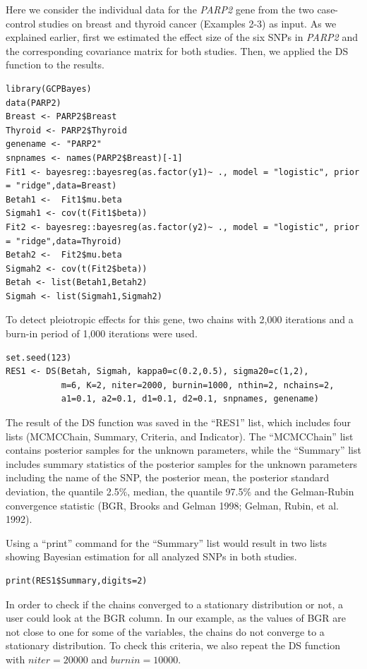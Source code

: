 Here we consider the individual data for the \emph{PARP2} gene from the two case-control studies on breast and thyroid cancer (Examples 2-3) as input. As we explained earlier, first we estimated the effect size of the six SNPs in \emph{PARP2} and the corresponding covariance matrix for both studies. Then, we applied the DS function to the results.

\begin{verbatim}
library(GCPBayes)
data(PARP2)
Breast <- PARP2$Breast
Thyroid <- PARP2$Thyroid
genename <- "PARP2"
snpnames <- names(PARP2$Breast)[-1]
Fit1 <- bayesreg::bayesreg(as.factor(y1)~ ., model = "logistic", prior = "ridge",data=Breast)
Betah1 <-  Fit1$mu.beta
Sigmah1 <- cov(t(Fit1$beta))
Fit2 <- bayesreg::bayesreg(as.factor(y2)~ ., model = "logistic", prior = "ridge",data=Thyroid)
Betah2 <-  Fit2$mu.beta
Sigmah2 <- cov(t(Fit2$beta))
Betah <- list(Betah1,Betah2)
Sigmah <- list(Sigmah1,Sigmah2)
\end{verbatim}

To detect pleiotropic effects for this gene, two chains with 2,000 iterations and a burn-in period of 1,000 iterations were used.

\begin{verbatim}
set.seed(123)
RES1 <- DS(Betah, Sigmah, kappa0=c(0.2,0.5), sigma20=c(1,2),
           m=6, K=2, niter=2000, burnin=1000, nthin=2, nchains=2,
           a1=0.1, a2=0.1, d1=0.1, d2=0.1, snpnames, genename)
\end{verbatim}

The result of the DS function was saved in the ``RES1'' list, which includes four lists (MCMCChain, Summary, Criteria, and Indicator).
The ``MCMCChain'' list contains posterior samples for the unknown parameters, while the ``Summary'' list includes summary statistics of the posterior samples for the unknown parameters including the name of the SNP, the posterior mean, the posterior standard deviation, the quantile 2.5\(\%\), median, the quantile 97.5\(\%\) and the Gelman-Rubin convergence statistic (BGR, Brooks and Gelman 1998; Gelman, Rubin, et al. 1992).

Using a ``print'' command for the ``Summary'' list would result in two lists showing Bayesian estimation for all analyzed SNPs in both studies.

\begin{verbatim}
print(RES1$Summary,digits=2)
\end{verbatim}

In order to check if the chains converged to a stationary distribution or not, a user could look at the BGR column. In our example, as the values of BGR are not close to one for some of the variables, the chains do not converge to a stationary distribution. To check this criteria, we also repeat the DS function with \(niter=20000\) and \(burnin=10000\).

